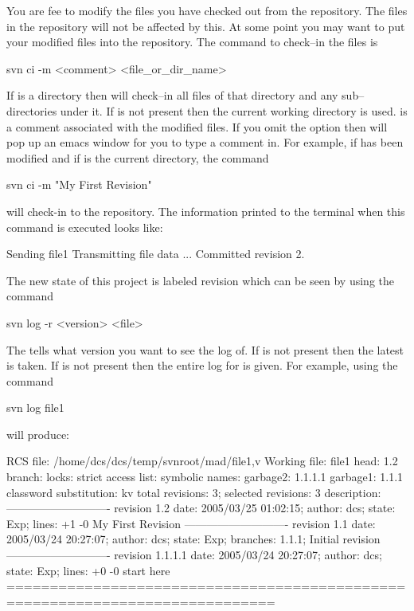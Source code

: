 You are fee to modify the files you have checked out from the
repository. The files in the repository will not be affected by this.
At some point you may want to put your modified files into the
repository. The command to check--in the files is
\begin{example}
  svn ci -m <comment> <file_or_dir_name>
\end{example}
If  is a directory then \svn will check--in all
files of that directory and any sub--directories under it. If
 is not present then the current working
directory is used.  is a comment associated with the
modified files. If you omit the  option then \svn
will pop up an emacs window for you to type a comment in.
For example, if  has been modified
and if  is the current directory, the command
\begin{example}
  svn ci -m "My First Revision"
\end{example}
will check-in  to the repository. The information printed to
the terminal when this command is executed looks like:
\begin{example}
  Sending    file1
  Transmitting file data ...
  Committed revision 2.
\end{example}
The new state of this project is labeled revision  which can be seen by using the command
\begin{example}
  svn log -r <version> <file>
\end{example}
The  tells \svn what version you want to see the log
of. If  is not present then the latest is taken. If
 is not present then the entire log for  is
given. For example, using the command 
\begin{example}
  svn log file1
\end{example}
will produce:
\begin{example}
  RCS file: /home/dcs/dcs/temp/svnroot/mad/file1,v
  Working file: file1
  head: 1.2
  branch:
  locks: strict
  access list:
  symbolic names:
          garbage2: 1.1.1.1
          garbage1: 1.1.1
  classword substitution: kv
  total revisions: 3;     selected revisions: 3
  description:
  ----------------------------
  revision 1.2
  date: 2005/03/25 01:02:15;  author: dcs;  state: Exp;  lines: +1 -0
  My First Revision
  ----------------------------
  revision 1.1
  date: 2005/03/24 20:27:07;  author: dcs;  state: Exp;
  branches:  1.1.1;
  Initial revision
  ----------------------------
  revision 1.1.1.1
  date: 2005/03/24 20:27:07;  author: dcs;  state: Exp;  lines: +0 -0
  start here
  =============================================================================
\end{example}
